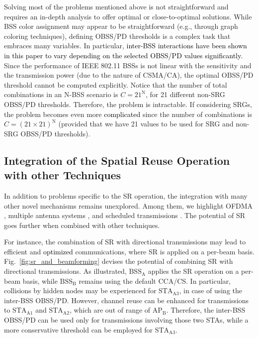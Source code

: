 \documentclass[preprint,12pt]{elsarticle}
\begin{document}
Solving most of the problems mentioned above is not straightforward and requires an in-depth analysis to offer optimal or close-to-optimal solutions. While BSS color assignment may appear to be straightforward (e.g., through graph coloring techniques), defining OBSS/PD thresholds is a complex task that embraces many variables. In particular, \textcolor{black}{inter-BSS interactions have been shown in this paper to vary depending on the selected OBSS/PD values significantly}. Since the performance of IEEE 802.11 BSSs is not linear with the sensitivity and the transmission power (due to the nature of CSMA/CA), the optimal OBSS/PD threshold cannot be computed explicitly. Notice that the number of total combinations in an N-BSS scenario is $C = 21^\text{N}$, for 21 different non-SRG OBSS/PD thresholds. Therefore, the problem is intractable. If considering SRGs, the problem becomes even more \textcolor{black}{complicated} since the number of combinations is $C = (21\times21)^\text{N}$ (provided that we have 21 values to be used for SRG and non-SRG OBSS/PD thresholds).

\subsection{Integration of the Spatial Reuse Operation with other Techniques}

In addition to problems specific to the SR operation, the integration with many other novel mechanisms remains unexplored. Among them, we highlight OFDMA \cite{bankov2018ofdma, dovelos2018optimal}, multiple antenna systems \cite{liao2016mu}, and scheduled transmissions \cite{nurchis2019target}. The potential of SR goes further when combined with other techniques. 

For instance, the combination of SR with directional transmissions may lead to efficient and \textcolor{black}{optimized} communications, where SR is applied on a per-beam basis. Fig.~\ref{fig:sr_and_beamforming} devises the potential of combining SR with directional transmissions. As illustrated, $\text{BSS}_\text{A}$ applies the SR operation on a per-beam basis, while $\text{BSS}_\text{B}$ remains using the default CCA/CS. In particular, collisions by hidden nodes may be experienced for $\text{STA}_\text{A3}$, in case of using the inter-BSS OBSS/PD. However, channel reuse can be enhanced for transmissions to $\text{STA}_\text{A1}$ and $\text{STA}_\text{A2}$, which are out of range of $\text{AP}_\text{B}$. Therefore, the inter-BSS OBSS/PD can be used only for transmissions involving those two STAs, while a more conservative threshold can be employed for $\text{STA}_\text{A3}$.
\end{document}
